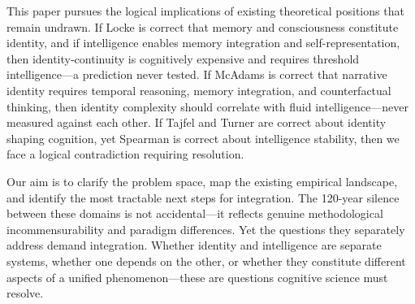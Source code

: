 \documentclass[12pt, a4paper]{article}
\begin{document}
This paper pursues the logical implications of existing theoretical positions that remain undrawn. If Locke is correct that memory and consciousness constitute identity, and if intelligence enables memory integration and self-representation, then identity-continuity is cognitively expensive and requires threshold intelligence—a prediction never tested. If McAdams is correct that narrative identity requires temporal reasoning, memory integration, and counterfactual thinking, then identity complexity should correlate with fluid intelligence—never measured against each other. If Tajfel and Turner are correct about identity shaping cognition, yet Spearman is correct about intelligence stability, then we face a logical contradiction requiring resolution.

Our aim is to clarify the problem space, map the existing empirical landscape, and identify the most tractable next steps for integration. The 120-year silence between these domains is not accidental—it reflects genuine methodological incommensurability and paradigm differences. Yet the questions they separately address demand integration. Whether identity and intelligence are separate systems, whether one depends on the other, or whether they constitute different aspects of a unified phenomenon—these are questions cognitive science must resolve.
\end{document}
